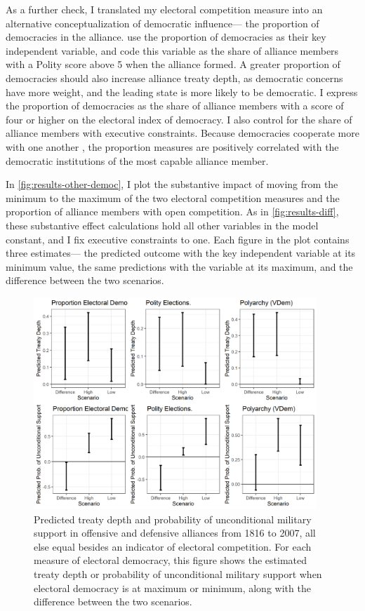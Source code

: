 \documentclass[12pt]{article}
\begin{document}
As a further check, I translated my electoral competition measure into an alternative conceptualization of democratic influence--- the proportion of democracies in the alliance.
\citet{Chibaetal2015} use the proportion of democracies as their key independent variable, and code this variable as the share of alliance members with a Polity score above 5 when the alliance formed. 
A greater proportion of democracies should also increase alliance treaty depth, as democratic concerns have more weight, and the leading state is more likely to be democratic. 
I express the proportion of democracies as the share of alliance members with a score of four or higher on the electoral index of democracy. 
I also control for the share of alliance members with executive constraints. 
Because democracies cooperate more with one another \citep{Leeds1999}, the proportion measures are positively correlated with the democratic institutions of the most capable alliance member. 


In \autoref{fig:results-other-democ}, I plot the substantive impact of moving from the minimum to the maximum of the two electoral competition measures and the proportion of alliance members with open competition. 
As in \autoref{fig:results-diff}, these substantive effect calculations hold all other variables in the model constant, and I fix executive constraints to one. 
Each figure in the plot contains three estimates--- the predicted outcome with the key independent variable at its minimum value, the same predictions with the variable at its maximum, and the difference between the two scenarios. 


\begin{figure}[hbtp]
\centering
\includegraphics[width=0.95\textwidth]{../figures/results-other-democ.png}
\caption{Predicted treaty depth and probability of unconditional military support in offensive and defensive alliances from 1816 to 2007, all else equal besides an indicator of electoral competition. For each measure of electoral democracy, this figure shows the estimated treaty depth or probability of unconditional military support when electoral democracy is at maximum or minimum, along with the difference between the two scenarios.}
\label{fig:results-other-democ}
\end{figure}
\end{document}
